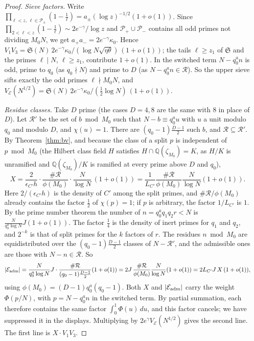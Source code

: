 \documentclass[11pt]{amsart}
\theoremstyle{remark}
\newcommand{\Q}{\mathbb Q}
\newcommand{\cE}{\mathcal E}
\newcommand{\cP}{\mathcal P}
\newcommand{\sS}{\mathfrak S}
\begin{document}
\begin{proof}
\emph{Sieve factors.} Write $\prod_{\ell<z,\ \ell\in\cP_\pm}(1-\frac1\ell)=a_\pm(\log z)^{-1/2}(1+o(1))$. Since $\prod_{2<\ell<z}(1-\frac1\ell)\sim2e^{-\gamma}/\log z$ and $\cP_+\cup\cP_-$ contains all odd primes not dividing $M_0N$, we get $a_+a_-=2e^{-\gamma}\kappa_0$. Hence $V_1V_3=\sS(N)\,2e^{-\gamma}\kappa_0/(\log N\sqrt{\eta\theta})\,(1+o(1))$; the tails $\ell\ge z_1$ of $\sS$ and the primes $\ell\mid N$, $\ell\ge z_1$, contribute $1+o(1)$. In the switched term $N-q_0^an$ is odd, prime to $q_0$ (as $q_0\nmid N$) and prime to $D$ (as $N-q_0^an\in\mathcal R$). So the upper sieve sifts exactly the odd primes $\ell\nmid M_0N$, and $V_\cE(N^{1/2})=\sS(N)\,2e^{-\gamma}\kappa_0/(\frac12\log N)\,(1+o(1))$.

\emph{Residue classes.} Take $D$ prime (the cases $D=4,8$ are the same with $8$ in place of $D$). Let $\mathcal R'$ be the set of $b\bmod M_0$ such that $N-b\equiv q_0^au$ with $u$ a unit modulo $q_0$ and modulo $D$, and $\chi(u)=1$. There are $(q_0-1)\frac{D-1}2$ such $b$, and $\mathcal R\subseteq\mathcal R'$. By Theorem~\ref{thm:bv}, and because the class of a split $p$ is independent of $p\bmod M_0$ (the Hilbert class field $H$ satisfies $H\cap\Q(\zeta_{M_0})=K$, as $H/K$ is unramified and $\Q(\zeta_{M_0})/K$ is ramified at every prime above $D$ and $q_0$),
\[
X=\frac2{\epsilon_{C'}h}\cdot\frac{\#\mathcal R}{\phi(M_0)}\cdot\frac N{\log N}\,(1+o(1))=\frac1{L_{C'}}\frac{\#\mathcal R}{\phi(M_0)}\frac N{\log N}(1+o(1)).
\]
Here $2/(\epsilon_{C'}h)$ is the density of $C'$ among the split primes, and $\#\mathcal R/\phi(M_0)$ already contains the factor $\frac12$ of $\chi(p)=1$; if $p$ is arbitrary, the factor $1/L_{C'}$ is $1$. By the prime number theorem the number of $n=q_0^aq_1q_2r<N$ is $\frac N{q_0^a\log N}J(1+o(1))$. The factor $\frac14$ is the density of inert primes for $q_1$ and $q_2$, and $2^{-k}$ is that of split primes for the $k$ factors of $r$. The residues $n\bmod M_0$ are equidistributed over the $(q_0-1)\frac{D-1}2$ classes of $N-\mathcal R'$, and the admissible ones are those with $N-n\in\mathcal R$. So
\[
|\cE_{\rm adm}|=\frac N{q_0^a\log N}J\cdot\frac{\#\mathcal R}{(q_0-1)\frac{D-1}2}(1+o(1))=2J\,\frac{\#\mathcal R}{\phi(M_0)}\frac N{\log N}(1+o(1))=2L_{C'}J\,X\,(1+o(1)),
\]
using $\phi(M_0)=(D-1)q_0^a(q_0-1)$. Both $X$ and $|\cE_{\rm adm}|$ carry the weight $\Phi(p/N)$, with $p=N-q_0^an$ in the switched term. By partial summation, each therefore contains the same factor $\int_0^1\Phi(u)\,du$, and this factor cancels; we have suppressed it in the displays. Multiplying by $2e^\gamma V_\cE(N^{1/2})$ gives the second line. The first line is $X\cdot V_1V_3$.
\end{proof}
\end{document}
